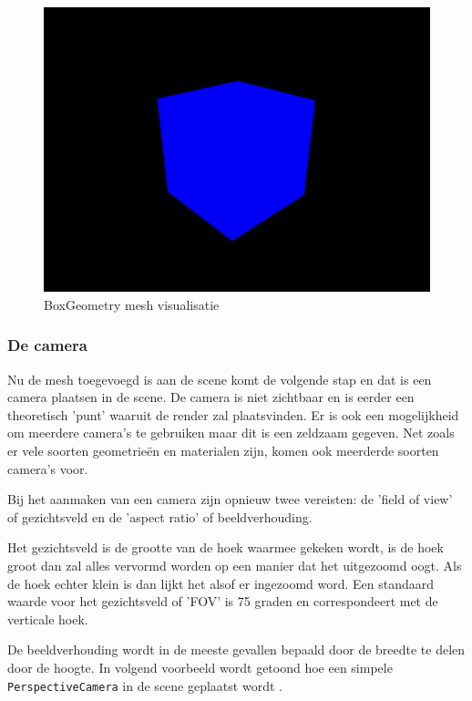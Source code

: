 \begin{figure}
\centering
\includegraphics[width=1\linewidth]{graphics/boxGeometry}
\caption[BoxGeometry mesh visualisatie]{BoxGeometry mesh visualisatie}
\label{fig:boxGeometry}
\end{figure}

\newpage
\subsubsection{De camera}

Nu de mesh toegevoegd is aan de scene komt de volgende stap en dat is een camera plaatsen in de scene. De camera is niet zichtbaar en is eerder een theoretisch 'punt' waaruit de render zal plaatsvinden. Er is ook een mogelijkheid om meerdere camera's te gebruiken maar dit is een zeldzaam gegeven. Net zoals er vele soorten geometrieën en materialen zijn, komen ook meerderde soorten camera's voor.

Bij het aanmaken van een camera zijn opnieuw twee vereisten: de 'field of view' of gezichtsveld en de 'aspect ratio' of beeldverhouding. 

Het gezichtsveld is de grootte van de hoek waarmee gekeken wordt, is de hoek groot dan zal alles vervormd worden op een manier dat het uitgezoomd oogt. Als de hoek echter klein is dan lijkt het alsof er ingezoomd word. Een standaard waarde voor het gezichtsveld of 'FOV' is 75 graden en correspondeert met de verticale hoek.

De beeldverhouding wordt in de meeste gevallen bepaald door de breedte te delen door de hoogte. In volgend voorbeeld wordt getoond hoe een simpele \texttt{PerspectiveCamera} in de scene geplaatst wordt \autocite{Simon2023}.

